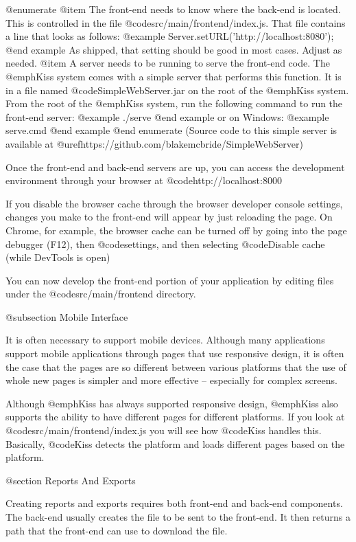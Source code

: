 @enumerate
@item
The front-end needs to know where the back-end is located.  This is
controlled in the file @code{src/main/frontend/index.js}.  That file
contains a line that looks as follows:
@example
    Server.setURL('http://localhost:8080');
@end example
As shipped, that setting should be good in most cases.  Adjust as needed.
@item
A server needs to be running to serve the front-end code.  The
@emph{Kiss} system comes with a simple server that performs this
function.  It is in a file named @code{SimpleWebServer.jar} on the
root of the @emph{Kiss} system.  From the root of the @emph{Kiss}
system, run the following command to run the front-end server:
@example
   ./serve
@end example
or on Windows:
@example
   serve.cmd
@end example
@end enumerate
(Source code to this simple server is available at 
@uref{https://github.com/blakemcbride/SimpleWebServer})

Once the front-end and back-end servers are up, you can access the development
environment through your browser at @code{http://localhost:8000}

If you disable the browser cache through the browser developer console
settings, changes you make to the front-end will appear by just
reloading the page.  On Chrome, for example, the browser cache can be
turned off by going into the page debugger (F12), then
@code{settings}, and then selecting @code{Disable cache (while DevTools
is open)}

You can now develop the front-end portion of your application by
editing files under the @code{src/main/frontend} directory.

@subsection Mobile Interface

It is often necessary to support mobile devices.  Although many
applications support mobile applications through pages that use
responsive design, it is often the case that the pages are so
different between various platforms that the use of whole new pages is
simpler and more effective -- especially for complex screens.

Although @emph{Kiss} has always supported responsive design,
@emph{Kiss} also supports the ability to have different pages for
different platforms.  If you look at @code{src/main/frontend/index.js}
you will see how @code{Kiss} handles this.  Basically, @code{Kiss}
detects the platform and loads different pages based on the platform.


@section Reports And Exports

Creating reports and exports requires both front-end and back-end components.
The back-end usually creates the file to be sent to the front-end.  It then returns
a path that the front-end can use to download the file.

